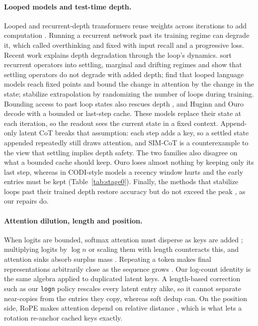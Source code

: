 \documentclass[11pt]{article}
\newcommand{\pol}[1]{\texttt{#1}}
\begin{document}
\paragraph{Looped models and test-time depth.} Looped and recurrent-depth transformers reuse weights across iterations to
add computation \citep{saunshi2025reasoning, fan2025looped, geiping2025huginn, zhu2025ouro}. Running a recurrent network past
its training regime can degrade it, which \citet{bansal2022overthinking} called overthinking and fixed with input recall and
a progressive loss. Recent work explains depth degradation through the loop's dynamics.
\citet{viakhirev2026thinkshallow} sort recurrent operators into settling, marginal and drifting regimes and show that settling
operators do not degrade with added depth; \citet{blayney2026mechanistic} find that looped language models reach fixed
points and bound the change in attention by the change in the state; \citet{kuo2026stabilizing} stabilize extrapolation by
randomizing the number of loops during training. Bounding access to past loop states also rescues depth
\citep{li2026infiloop, recurtrace2026}, and Huginn and Ouro decode with a bounded or last-step cache. These models replace
their state at each iteration, so the readout sees the current state in a fixed context. Append-only latent CoT breaks that
assumption: each step adds a key, so a settled state appended repeatedly still draws attention, and SIM-CoT is a
counterexample to the view that settling implies depth safety. The two families also disagree on what a bounded cache should
keep. Ouro loses almost nothing by keeping only its last step, whereas in CODI-style models a recency window hurts and the
early entries must be kept (Table~\ref{tab:stage0}). Finally, the methods that stabilize loops past their trained depth
restore accuracy but do not exceed the peak \citep{viakhirev2026thinkshallow}, as our repairs do.

\paragraph{Attention dilution, length and position.} When logits are bounded, softmax attention must disperse as keys are
added \citep{velickovic2025softmax}; multiplying logits by $\log n$ \citep{chiang2022overcoming} or scaling them with length
\citep{nakanishi2025ssmax} counteracts this, and attention sinks absorb surplus mass \citep{xiao2024streamingllm}. Repeating
a token makes final representations arbitrarily close as the sequence grows \citep{barbero2024glasses}. Our log-count identity
is the same algebra applied to duplicated latent keys. A length-based correction such as our \pol{logn} policy rescales every
latent entry alike, so it cannot separate near-copies from the entries they copy, whereas soft dedup can. On the position
side, RoPE makes attention depend on relative distance \citep{su2024roformer}, which is what lets a rotation re-anchor
cached keys exactly.
\end{document}
